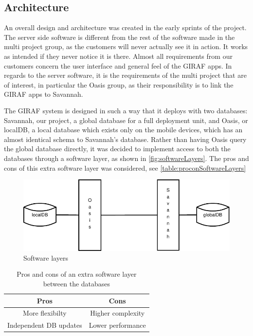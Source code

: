 \subsection{Architecture}
An overall design and architecture was created in the early sprints of the project.
 The server side software is different from the rest of the software made in the multi project group, as the customers will never actually see it in action. It works as intended if they never notice it is there.
Almost all requirements from our customers concern the user interface and general feel of the GIRAF apps. In regards to the server software, it is the requirements of the multi project that are of interest,
in particular the Oasis group, as their responsibility is to link the GIRAF apps to Savannah.

The GIRAF system is designed in such a way that it deploys with two databases: Savannah, our project, a global database for a full deployment unit, and Oasis, or localDB, a local database which exists only
on the mobile devices, which has an almost identical schema to Savannah's database.
Rather than having Oasis query the global database directly, it was decided to implement access to both the databases through a software layer, as shown in \autoref{fig:softwareLayers}.
The pros and cons of this extra software layer was considered, see \autoref{table:proconSoftwareLayers}

\begin{figure}[H]
	\centering
		\includegraphics[scale=1]{images/softwareLayers}
	\caption{Software layers}
	\label{fig:softwareLayers}
\end{figure}

\begin{table}[H]
  \begin{center}
    \begin{tabular}{c|c}
    Pros                   &             Cons \\
    \hline
    More flexibilty        & Higher complexity\\
    Independent DB updates & Lower performance\\
    \end{tabular}
    \caption{Pros and cons of an extra software layer between the databases}
    \label{table:proconSoftwareLayers}
  \end{center}
\end{table}

